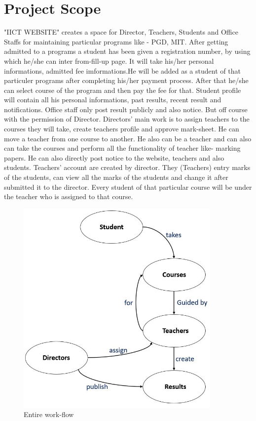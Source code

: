\documentclass{scrreprt}
\begin{document}
\section{Project Scope}
"IICT WEBSITE" creates a space for Director, Teachers, Students and Office Staffs for maintaining particular programs like - PGD, MIT. 
\newline
After getting admitted to a programs a student has been given a registration number, by using which he/she can inter from-fill-up page. It will take his/her personal informations, admitted fee imformations.He will be added as a student of that particuler programs after completing his/her payment process. After that he/she can select course of the program and then pay the fee for that. Student profile will contain all his personal informations, past results, recent result and notifications.
\newline
Office staff only post result publicly and also notice. But off course with the permission of Director.  
\newline
Directors' main work is to assign teachers to the courses they will take, create teachers profile and approve mark-sheet. He can move a teacher from one course to another. He also can be a teacher and can also can take the courses and perform all the functionality of teacher like- marking papers. He can also directly post notice to the website, teachers and also students.
\newline
Teachers' account are created by director. They (Teachers) entry marks of the students, can view all the marks of the students and change it after submitted it to the director. Every student of that particular course will be under the teacher who is assigned to that course. 
\newline
\begin{figure}
    \centering
    \includegraphics[width=10cm]{1.JPG}
    \caption{Entire work-flow}
    \label{fig:IICT WEBSITE}
\end{figure}
\end{document}
